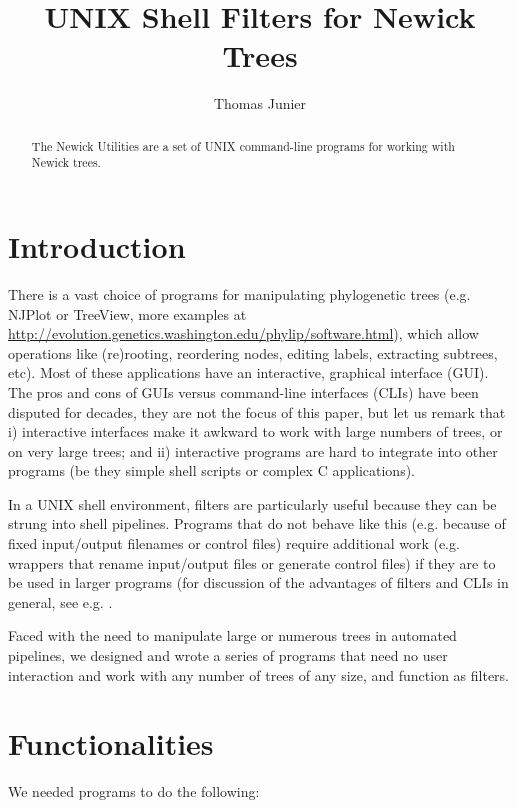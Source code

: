 \documentclass[a4paper,10pt]{article}
\title{UNIX Shell Filters for Newick Trees}
\author{Thomas Junier}
\begin{document}
\maketitle

\begin{abstract}
The Newick Utilities are a set of UNIX command-line programs for working with
Newick trees.
\end{abstract}
\section{Introduction}

There is a vast choice of programs for manipulating phylogenetic trees (e.g.
NJPlot or TreeView, more examples at \url{
http://evolution.genetics.washington.edu/phylip/software.html}), which allow
operations like (re)rooting, reordering nodes, editing labels, extracting
subtrees, etc). Most of these applications have an interactive, graphical interface (GUI). The pros and cons of GUIs versus command-line interfaces (CLIs) have been disputed for decades, they are not the focus of this paper, but let us remark that i) interactive interfaces make it
awkward to work with large numbers of trees, or on very large trees; and ii) interactive programs are hard to integrate into other programs (be they simple shell scripts or complex C applications).

In a UNIX shell environment, filters are particularly useful because they can be strung into shell pipelines. Programs that do not behave like this (e.g. because of fixed input/output filenames or control files) require additional work (e.g. wrappers that rename input/output files or generate control files) if they are to be used in larger programs (for discussion of the advantages of filters and CLIs in general, see e.g. \cite{Gancarz2002}.

Faced with the need to
manipulate large or numerous trees in automated pipelines, we designed and wrote
a series of programs that need no user interaction and work with any number of
trees of any size, and function as filters.

\section{Functionalities}

We needed programs to do the following:
\end{document}

